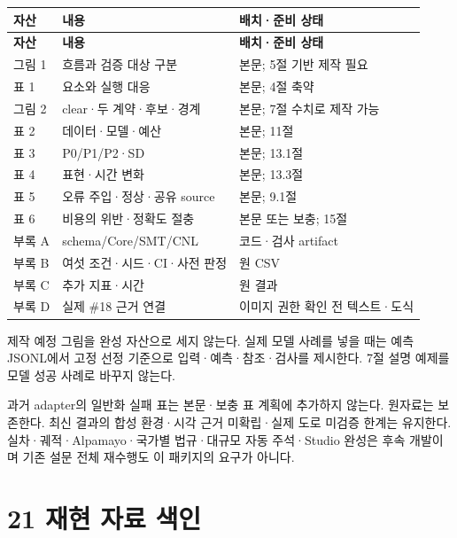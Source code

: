 \documentclass[11pt,a4paper]{article}
\begin{document}
\begingroup\small
\begin{longtable}{@{}>{\raggedright\arraybackslash}p{}>{\raggedright\arraybackslash}p{}>{\raggedright\arraybackslash}p{}@{}}
\toprule
\textbf{자산} & \textbf{내용} & \textbf{배치·준비 상태} \\
\midrule\endfirsthead
\toprule
\textbf{자산} & \textbf{내용} & \textbf{배치·준비 상태} \\
\midrule\endhead
\bottomrule\endfoot
그림 1 & 흐름과 검증 대상 구분 & 본문; 5절 기반 제작 필요 \\
표 1 & 요소와 실행 대응 & 본문; 4절 축약 \\
그림 2 & clear·두 계약·후보·경계 & 본문; 7절 수치로 제작 가능 \\
표 2 & 데이터·모델·예산 & 본문; 11절 \\
표 3 & P0/P1/P2·SD & 본문; 13.1절 \\
표 4 & 표현·시간 변화 & 본문; 13.3절 \\
표 5 & 오류 주입·정상·공유 source & 본문; 9.1절 \\
표 6 & 비용의 위반·정확도 절충 & 본문 또는 보충; 15절 \\
부록 A & schema/Core/SMT/CNL & 코드·검사 artifact \\
부록 B & 여섯 조건·시드·CI·사전 판정 & 원 CSV \\
부록 C & 추가 지표·시간 & 원 결과 \\
부록 D & 실제 \#18 근거 연결 & 이미지 권한 확인 전 텍스트·도식 \\
\end{longtable}
\endgroup

제작 예정 그림을 완성 자산으로 세지 않는다. 실제 모델 사례를 넣을 때는 예측 JSONL에서 고정 선정 기준으로 입력·예측·참조·검사를 제시한다. 7절 설명 예제를 모델 성공 사례로 바꾸지 않는다.\par

과거 adapter의 일반화 실패 표는 본문·보충 표 계획에 추가하지 않는다. 원자료는 보존한다. 최신 결과의 합성 환경·시각 근거 미확립·실제 도로 미검증 한계는 유지한다. 실차·궤적·Alpamayo·국가별 법규·대규모 자동 주석·Studio 완성은 후속 개발이며 기존 설문 전체 재수행도 이 패키지의 요구가 아니다.\par

\clearpage{}\section*{21 재현 자료 색인}
\end{document}
